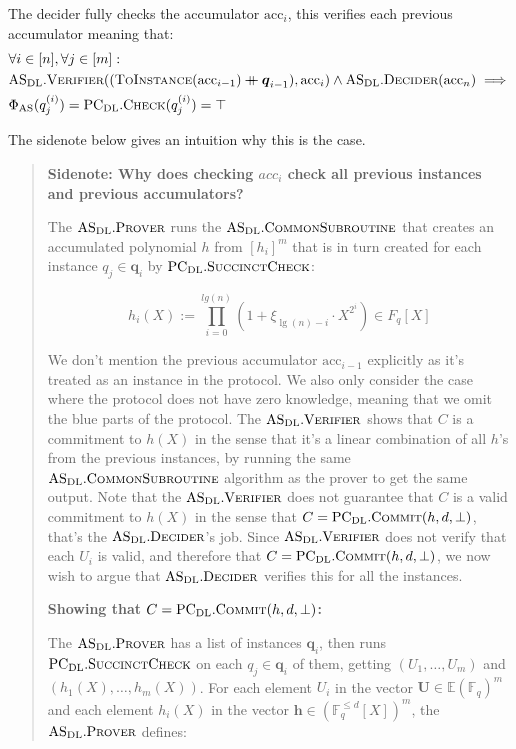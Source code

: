 \documentclass[
]{article}
\newcommand*\Fb{\mathbb{F}}
\newcommand*\Eb{\mathbb{E}}
\newcommand*\cat{\mathbin{+\mkern-10mu+}}
\renewcommand{\vec}[1]{ \boldsymbol{#1} }
\newcommand*{\acc}{\mathrm{acc}}
\newcommand*{\ToInstance}{\mathrm{\text{T\scriptsize O}\text{I\scriptsize NSTANCE}}}
\newcommand*{\Commit}{\mathrm{\text{C{\scriptsize OMMIT}}}}
\newcommand*{\AS}{\text{AS}}
\newcommand*{\PCDL}{\text{PC}_{\text{DL}}}
\newcommand*{\PCDLCommit}{\PCDL.\Commit}
\newcommand*{\PCDLSuccinctCheck}{\PCDL.\mathrm{\text{S{\scriptsize UCCINCT}C{\scriptsize HECK}}}}
\newcommand*{\PCDLCheck}{\PCDL.\mathrm{\text{C\scriptsize HECK}}}
\newcommand*{\ASDL}{\text{AS}_{\text{DL}}}
\newcommand*{\ASDLCommonSubroutine}{\ASDL.\mathrm{\text{C{\scriptsize OMMON}S{\scriptsize UBROUTINE}}}}
\newcommand*{\ASDLProver}{\ASDL.\mathrm{\text{P\scriptsize ROVER}}}
\newcommand*{\ASDLVerifier}{\ASDL.\mathrm{\text{V\scriptsize ERIFIER}}}
\newcommand*{\ASDLDecider}{\ASDL.\mathrm{\text{D\scriptsize ECIDER}}}
\begin{document}
The decider fully checks the accumulator \(\acc_i\), this verifies each
previous accumulator meaning that: \[
\begin{aligned}
  &\forall i \in [n], \forall j \in [m] : \\
  &\ASDLVerifier((\ToInstance(\acc_{i-1}) \cat \vec{q}_{i-1}), \acc_i) \land \ASDLDecider(\acc_n) \implies \\
  &\Phi_\AS(q^{(i)}_j) = \PCDLCheck(q^{(i)}_j) = \top
\end{aligned}
\]

The sidenote below gives an intuition why this is the case.

\begin{quote}
\color{GbGrey}

\textbf{Sidenote: Why does checking $acc_i$ check all previous instances
and previous accumulators?}

The $\ASDLProver$ runs the $\ASDLCommonSubroutine$ that creates an accumulated
polynomial $h$ from $[h_i]^m$ that is in turn created for each instance $q_j
\in \vec{q}_i$ by $\PCDLSuccinctCheck$:

$$h_i(X) := \prod^{lg(n)}_{i=0} (1 + \xi_{\lg(n)-i} \cdot X^{2^i}) \in F_q[X]$$

We don't mention the previous accumulator $\acc_{i-1}$ explicitly as it's
treated as an instance in the protocol. We also only consider the case where
the protocol does not have zero knowledge, meaning that we omit the blue parts
of the protocol. The $\ASDLVerifier$ shows that $C$ is a commitment to $h(X)$
in the sense that it's a linear combination of all $h$'s from the previous
instances, by running the same $\ASDLCommonSubroutine$ algorithm as the prover
to get the same output. Note that the $\ASDLVerifier$ does not guarantee that
$C$ is a valid commitment to $h(X)$ in the sense that $C = \PCDLCommit(h, d,
\bot)$, that's the $\ASDLDecider$'s job. Since $\ASDLVerifier$ does not verify
that each $U_i$ is valid, and therefore that $C = \PCDLCommit(h, d, \bot)$,
we now wish to argue that $\ASDLDecider$ verifies this for all the instances.

\textbf{Showing that $C = \PCDLCommit(h, d, \bot)$:}

The $\ASDLProver$ has a list of instances $\vec{q}_i$, then runs
$\PCDLSuccinctCheck$ on each $q_j \in \vec{q}_i$ of them, getting $(U_1,
\dots, U_m)$ and $(h_1(X), \dots, h_m(X))$. For each element $U_i$ in the
vector $\vec{U} \in \Eb(\Fb_q)^m$ and each element $h_i(X)$ in the vector
$\vec{h} \in (\Fb^{\leq d}_q[X])^m$, the $\ASDLProver$ defines:


\end{quote}
\end{document}
